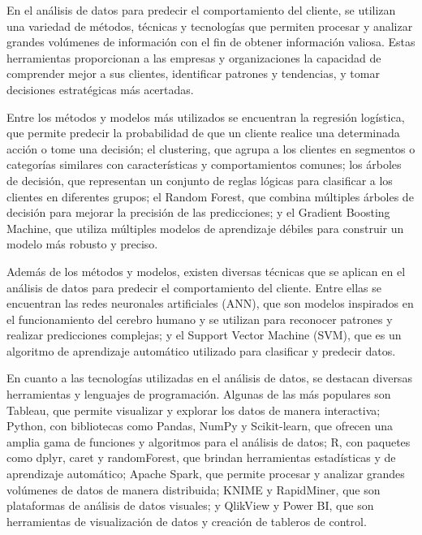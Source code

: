 En el análisis de datos para predecir el comportamiento del cliente, se utilizan una variedad de métodos, técnicas y tecnologías que permiten procesar y analizar grandes volúmenes de información con el fin de obtener información valiosa. Estas herramientas proporcionan a las empresas y organizaciones la capacidad de comprender mejor a sus clientes, identificar patrones y tendencias, y tomar decisiones estratégicas más acertadas.

Entre los métodos y modelos más utilizados se encuentran la regresión logística, que permite predecir la probabilidad de que un cliente realice una determinada acción o tome una decisión; el clustering, que agrupa a los clientes en segmentos o categorías similares con características y comportamientos comunes; los árboles de decisión, que representan un conjunto de reglas lógicas para clasificar a los clientes en diferentes grupos; el Random Forest, que combina múltiples árboles de decisión para mejorar la precisión de las predicciones; y el Gradient Boosting Machine, que utiliza múltiples modelos de aprendizaje débiles para construir un modelo más robusto y preciso.

Además de los métodos y modelos, existen diversas técnicas que se aplican en el análisis de datos para predecir el comportamiento del cliente. Entre ellas se encuentran las redes neuronales artificiales (ANN), que son modelos inspirados en el funcionamiento del cerebro humano y se utilizan para reconocer patrones y realizar predicciones complejas; y el Support Vector Machine (SVM), que es un algoritmo de aprendizaje automático utilizado para clasificar y predecir datos.

En cuanto a las tecnologías utilizadas en el análisis de datos, se destacan diversas herramientas y lenguajes de programación. Algunas de las más populares son Tableau, que permite visualizar y explorar los datos de manera interactiva; Python, con bibliotecas como Pandas, NumPy y Scikit-learn, que ofrecen una amplia gama de funciones y algoritmos para el análisis de datos; R, con paquetes como dplyr, caret y randomForest, que brindan herramientas estadísticas y de aprendizaje automático; Apache Spark, que permite procesar y analizar grandes volúmenes de datos de manera distribuida; KNIME y RapidMiner, que son plataformas de análisis de datos visuales; y QlikView y Power BI, que son herramientas de visualización de datos y creación de tableros de control.